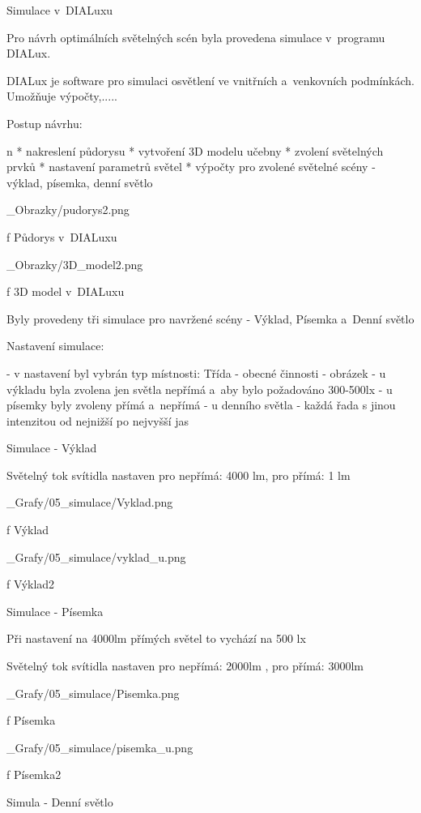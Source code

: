 \chap Simulace v~DIALuxu

Pro návrh optimálních světelných scén byla provedena simulace v~programu DIALux.

DIALux je software pro simulaci osvětlení ve vnitřních a~venkovních podmínkách. Umožňuje výpočty,.....

\medskip
Postup návrhu:

\begitems \style n
* nakreslení půdorysu
* vytvoření 3D modelu učebny
* zvolení světelných prvků
* nastavení parametrů světel
* výpočty pro zvolené světelné scény - výklad, písemka, denní světlo
\enditems
\medskip

\medskip {}
\picw=8cm _Obrazky/pudorys2.png
\caption/f Půdorys v~DIALuxu
\medskip

\medskip {}
\picw=8cm _Obrazky/3D_model2.png
\caption/f 3D model v~DIALuxu
\medskip

Byly provedeny tři simulace pro navržené scény - Výklad, Písemka a~Denní světlo

Nastavení simulace:

- v nastavení byl vybrán typ místnosti: Třída - obecné činnosti
- obrázek
- u výkladu byla zvolena jen světla nepřímá a~aby bylo požadováno 300-500lx
- u písemky byly zvoleny přímá a~nepřímá
- u denního světla - každá řada s jinou intenzitou od nejnižší po nejvyšší jas

\sec Simulace - Výklad

Světelný tok svítidla nastaven pro nepřímá: 4000 lm, pro přímá: 1 lm

\medskip {}
\picw=10cm _Grafy/05_simulace/Vyklad.png
\caption/f Výklad
\medskip

\medskip {}
\picw=10cm _Grafy/05_simulace/vyklad_u.png
\caption/f Výklad2
\medskip

\sec Simulace - Písemka

Při nastavení na 4000lm přímých světel to vychází na 500 lx

Světelný tok svítidla nastaven pro nepřímá: 2000lm , pro přímá: 3000lm

\medskip {}
\picw=10cm _Grafy/05_simulace/Pisemka.png
\caption/f Písemka
\medskip

\medskip {}
\picw=10cm _Grafy/05_simulace/pisemka_u.png
\caption/f Písemka2
\medskip

\sec Simula - Denní světlo

